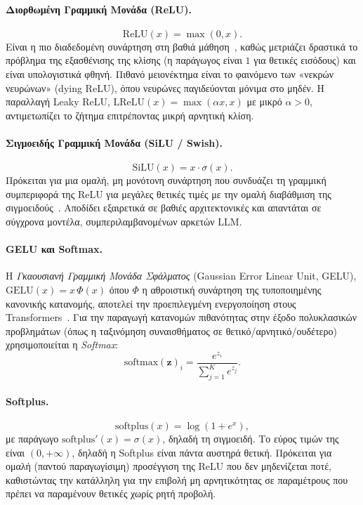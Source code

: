\paragraph{Διορθωμένη Γραμμική Μονάδα (ReLU).}
\begin{equation}
    \mathrm{ReLU}(x) = \max(0, x).
    \label{eq:relu}
\end{equation}
Είναι η πιο διαδεδομένη συνάρτηση στη βαθιά μάθηση~\cite{nair2010relu}, καθώς
μετριάζει δραστικά το πρόβλημα της εξασθένισης της κλίσης (η παράγωγος είναι
$1$ για θετικές εισόδους) και είναι υπολογιστικά φθηνή. Πιθανό μειονέκτημα
είναι το φαινόμενο των «νεκρών νευρώνων»
(dying ReLU), όπου νευρώνες παγιδεύονται μόνιμα στο
μηδέν. Η παραλλαγή Leaky ReLU,
$\mathrm{LReLU}(x)=\max(\alpha x, x)$ με μικρό $\alpha>0$, αντιμετωπίζει το
ζήτημα επιτρέποντας μικρή αρνητική κλίση.

\paragraph{Σιγμοειδής Γραμμική Μονάδα (SiLU / Swish).}
\begin{equation}
    \mathrm{SiLU}(x) = x \cdot \sigma(x).
    \label{eq:silu}
\end{equation}
Πρόκειται για μια ομαλή, μη μονότονη συνάρτηση που συνδυάζει τη γραμμική
συμπεριφορά της ReLU για μεγάλες θετικές τιμές με
την ομαλή διαβάθμιση της σιγμοειδούς~\cite{elfwing2018silu,ramachandran2017swish}.
Αποδίδει εξαιρετικά σε βαθιές αρχιτεκτονικές και απαντάται σε σύγχρονα
μοντέλα, συμπεριλαμβανομένων αρκετών LLM.

\paragraph{GELU και Softmax.}
Η \emph{Γκαουσιανή Γραμμική Μονάδα Σφάλματος}
(Gaussian Error Linear Unit, GELU),
$\mathrm{GELU}(x) = x\,\Phi(x)$ όπου $\Phi$ η αθροιστική συνάρτηση της
τυποποιημένης κανονικής κατανομής, αποτελεί την προεπιλεγμένη ενεργοποίηση
στους Transformers~\cite{hendrycks2016gelu}. Για
την παραγωγή κατανομών πιθανότητας στην έξοδο πολυκλασικών προβλημάτων (όπως
η ταξινόμηση συναισθήματος σε θετικό/αρνητικό/ουδέτερο) χρησιμοποιείται η
\emph{Softmax}:
\begin{equation}
    \mathrm{softmax}(\mathbf{z})_i = \frac{e^{z_i}}{\sum_{j=1}^{K} e^{z_j}}.
    \label{eq:softmax}
\end{equation}

\paragraph{Softplus.}
\begin{equation}
    \mathrm{softplus}(x) = \log(1 + e^{x}),
    \label{eq:softplus}
\end{equation}
με παράγωγο $\mathrm{softplus}'(x) = \sigma(x)$, δηλαδή τη σιγμοειδή. Το εύρος
τιμών της είναι $(0, +\infty)$, δηλαδή η Softplus είναι πάντα αυστηρά θετική.
Πρόκειται για ομαλή (παντού παραγωγίσιμη) προσέγγιση της ReLU που δεν μηδενίζεται
ποτέ, καθιστώντας την κατάλληλη για την επιβολή μη αρνητικότητας σε παραμέτρους
που πρέπει να παραμένουν θετικές χωρίς ρητή προβολή.

